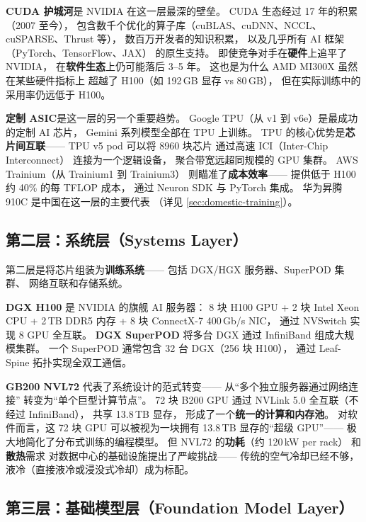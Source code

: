 \textbf{CUDA 护城河}是 NVIDIA 在这一层最深的壁垒。
CUDA 生态经过 17 年的积累（2007 至今），
包含数千个优化的算子库（cuBLAS、cuDNN、NCCL、
cuSPARSE、Thrust 等），
数百万开发者的知识积累，
以及几乎所有 AI 框架（PyTorch、TensorFlow、JAX）
的原生支持。
即使竞争对手在\textbf{硬件}上追平了 NVIDIA，
在\textbf{软件生态}上仍可能落后 3--5 年。
这也是为什么 AMD MI300X 虽然在某些硬件指标上
超越了 H100（如 192\,GB 显存 vs 80\,GB），
但在实际训练中的采用率仍远低于 H100。

\textbf{定制 ASIC}是这一层的另一个重要趋势。
Google TPU（从 v1 到 v6e）是最成功的定制 AI 芯片，
Gemini 系列模型全部在 TPU 上训练。
TPU 的核心优势是\textbf{芯片间互联}——
TPU v5 pod 可以将 8960 块芯片
通过高速 ICI（Inter-Chip Interconnect）
连接为一个逻辑设备，
聚合带宽远超同规模的 GPU 集群。
AWS Trainium（从 Trainium1 到 Trainium3）
则瞄准了\textbf{成本效率}——
提供低于 H100 约 40\% 的每 TFLOP 成本，
通过 Neuron SDK 与 PyTorch 集成。
华为昇腾 910C 是中国在这一层的主要代表
（详见 \cref{sec:domestic-training}）。

\subsection{第二层：系统层（Systems Layer）}

第二层是将芯片组装为\textbf{训练系统}——
包括 DGX/HGX 服务器、SuperPOD 集群、
网络互联和存储系统。

\textbf{DGX H100} 是 NVIDIA 的旗舰 AI 服务器：
8 块 H100 GPU + 2 块 Intel Xeon CPU +
2\,TB DDR5 内存 + 8 块 ConnectX-7 400\,Gb/s NIC，
通过 NVSwitch 实现 8 GPU 全互联。
\textbf{DGX SuperPOD} 将多台 DGX 通过
InfiniBand 组成大规模集群。
一个 SuperPOD 通常包含 32 台 DGX（256 块 H100），
通过 Leaf-Spine 拓扑实现全双工通信。

\textbf{GB200 NVL72} 代表了系统设计的范式转变——
从``多个独立服务器通过网络连接''
转变为``单个巨型计算节点''。
72 块 B200 GPU 通过 NVLink 5.0 全互联（不经过 InfiniBand），
共享 13.8\,TB 显存，
形成了一个\textbf{统一的计算和内存池}。
对软件而言，这 72 块 GPU
可以被视为一块拥有 13.8\,TB 显存的``超级 GPU''——
极大地简化了分布式训练的编程模型。
但 NVL72 的\textbf{功耗}（约 120\,kW per rack）
和\textbf{散热}需求
对数据中心的基础设施提出了严峻挑战——
传统的空气冷却已经不够，
液冷（直接液冷或浸没式冷却）成为标配。

\subsection{第三层：基础模型层（Foundation Model Layer）}

